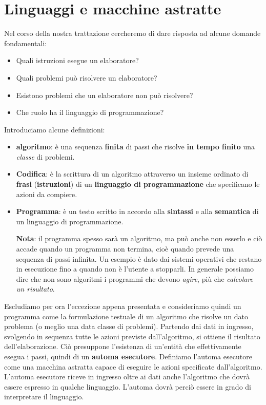 \documentclass[11pt]{book}
\begin{document}
\chapter{Linguaggi e macchine astratte}


Nel corso della nostra trattazione cercheremo di dare risposta ad
alcune domande fondamentali:

\begin{itemize}
\item Quali istruzioni esegue un elaboratore?
\item Quali problemi pu\`o risolvere un elaboratore?
\item Esistono problemi che un elaboratore non pu\`o risolvere?
\item Che ruolo ha il linguaggio di programmazione?
\end{itemize}


Introduciamo alcune definizioni:

\begin{itemize}
\item \textbf{algoritmo}: \`e una sequenza \textbf{finita} di passi
  che risolve \textbf{in tempo finito} una \textit{classe} di
  problemi.

\item \textbf{Codifica}: \`e la scrittura di un algoritmo attraverso
  un insieme ordinato di \textbf{frasi} (\textbf{istruzioni}) di un
  \textbf{linguaggio di programmazione} che specificano le azioni da
  compiere.

\item \textbf{Programma}: \`e un testo scritto in accordo alla
  \textbf{sintassi} e alla \textbf{semantica} di un linguaggio di
  programmazione. 

  \textbf{Nota}: il programma spesso sar\`a un algoritmo, ma pu\`o
  anche non esserlo e ci\`o accade quando un programma non termina,
  cio\`e quando prevede una sequenza di passi infinita. Un esempio \`e
  dato dai sistemi operativi che restano in esecuzione fino a quando
  non \`e l'utente a stopparli. In generale possiamo dire che non sono
  algoritmi i programmi che devono \textit{agire}, pi\`u che
  \textit{calcolare un risultato}.

\end{itemize}


Escludiamo per ora l'eccezione appena presentata e consideriamo quindi
un programma come la formulazione testuale di un algoritmo che risolve
un dato problema (o meglio una data classe di problemi). Partendo dai
dati in ingresso, svolgendo in sequenza tutte le azioni previste
dall'algoritmo, si ottiene il risultato dell'elaborazione. Ci\`o
presuppone l'esistenza di un'entit\`a che effettivamente esegua i
passi, quindi di un \textbf{automa esecutore}. Definiamo l'automa
esecutore come una macchina astratta capace di eseguire le azioni
specificate dall'algoritmo. L'automa esecutore riceve in ingresso
oltre ai dati anche l'algoritmo che dovr\`a essere espresso in qualche
linguaggio. L'automa dovr\`a perci\`o essere in grado di interpretare
il linguaggio. 
\end{document}
